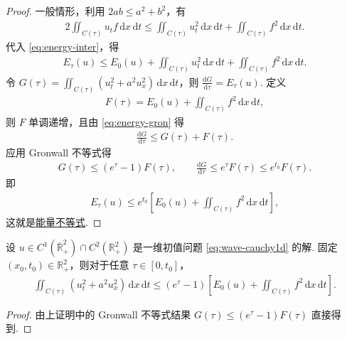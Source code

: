 \documentclass[../../main.tex]{subfiles}%
\begin{document}
\begin{proof}
一般情形，利用 $2ab\leqslant a^2+b^2$，有
\begin{align*}
2\iint_{C(\tau)}u_tf\,\mathrm{d}x\,\mathrm{d}t\leqslant \iint_{C(\tau)}u_t^2\,\mathrm{d}x\,\mathrm{d}t+\iint_{C(\tau)}f^2\,\mathrm{d}x\,\mathrm{d}t.
\end{align*}
代入 \eqref{eq:energy-inter}，得
\begin{align}
E_\tau(u)\leqslant E_0(u)+\iint_{C(\tau)}u_t^2\,\mathrm{d}x\,\mathrm{d}t+\iint_{C(\tau)}f^2\,\mathrm{d}x\,\mathrm{d}t. \label{eq:energy-gron}
\end{align}
令 $G(\tau)=\iint_{C(\tau)}(u_t^2+a^2u_x^2)\,\mathrm{d}x\,\mathrm{d}t$，则 $\frac{\mathrm{d}G}{\mathrm{d}\tau}=E_\tau(u)$. 定义
\begin{align*}
F(\tau)=E_0(u)+\iint_{C(\tau)}f^2\,\mathrm{d}x\,\mathrm{d}t,
\end{align*}
则 $F$ 单调递增，且由 \eqref{eq:energy-gron} 得
\begin{align*}
\frac{\mathrm{d}G}{\mathrm{d}\tau}\leqslant G(\tau)+F(\tau).
\end{align*}
应用 Gronwall 不等式得
\begin{align*}
G(\tau)\leqslant (e^\tau-1)F(\tau),\qquad \frac{\mathrm{d}G}{\mathrm{d}\tau}\leqslant e^\tau F(\tau)\leqslant e^{t_0}F(\tau).
\end{align*}
即
\begin{align*}
E_\tau(u)\leqslant e^{t_0}\left[E_0(u)+\iint_{C(\tau)}f^2\,\mathrm{d}x\,\mathrm{d}t\right],
\end{align*}
这就是\hyperref[theorem:一维能量不等式]{能量不等式}.
\end{proof}

\begin{corollary}[能量模的积分形式]
设 $u\in C^1(\overline{\mathbb{R}}^2_+)\cap C^2(\mathbb{R}^2_+)$ 是一维初值问题 \eqref{eq:wave-cauchy1d} 的解. 固定 $(x_0,t_0)\in\mathbb{R}^2_+$，则对于任意 $\tau\in[0,t_0]$，
\begin{align}
\iint_{C(\tau)}(u_t^2+a^2u_x^2)\,\mathrm{d}x\,\mathrm{d}t
\leqslant (e^\tau-1)\left[E_0(u)+\iint_{C(\tau)}f^2\,\mathrm{d}x\,\mathrm{d}t\right]. \label{eq:energy-integral-form}
\end{align}
\end{corollary}
\begin{proof}
由上证明中的 Gronwall 不等式结果 $G(\tau)\leqslant (e^\tau-1)F(\tau)$ 直接得到.
\end{proof}
\end{document}
